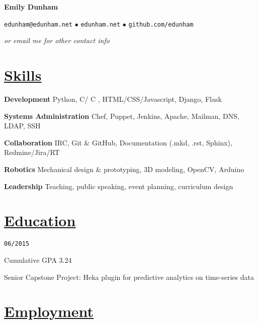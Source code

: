 \documentclass[11pt]{article}
\newcommand{\heading}[1]{
    \section*{\uline{\hfill #1}}
}
\newcommand{\squish}{
    \setlength{\itemsep}{0.5pt}
    \setlength{\parskip}{0pt}
    \setlength{\parsep}{0.5pt}
}
\newcommand{\when}[1]{
    \hfill \texttt{#1}
}
\newcommand{\experience}[3]{
\item[{#1}, \emph{#2}]
    \when{#3}
}
\newcommand{\contact}[3]{
    \centerline{
        \large       
        \texttt{#1}
        $\bullet$
        \texttt{#2}
        $\bullet$
        \texttt{#3}
    }
    \centerline{
        \emph{or email me for other contact info}
    }
}
\newcommand{\skill}[2]{
    \textbf{#1} \hfill #2

}
\newcommand{\CPP}{
    C\hspace{-.05em}\raisebox{.4ex}{\tiny\bf +}\hspace{-.10em}\raisebox{.4ex}{\tiny\bf +}
}
\begin{document}
\centerline{{\Huge \bf Emily Dunham}}
\bigskip

\contact{edunham@edunham.net}
        {edunham.net}
        {github.com/edunham}

\heading{Skills}%

\skill{Development}{Python, C/\CPP, HTML/CSS/Javascript, Django, Flask}

\skill{Systems Administration}{Chef, Puppet, Jenkins, Apache, Mailman, DNS, LDAP,
SSH}

\skill{Collaboration}{IRC, Git \& GitHub, Documentation (.mkd, .rst, Sphinx),
Redmine/Jira/RT} 

\skill{Robotics}{Mechanical design \& prototyping, 3D modeling, OpenCV, Arduino}

\skill{Leadership}{Teaching, public speaking, event planning, curriculum
design}

\heading{Education}%

\begin{description}
\squish
\experience{Oregon State University}
           {Bachelor of Science, Computer Science}
           {06/2015}

    Cumulative GPA 3.24

    Senior Capstone Project: Heka plugin for predictive analytics on
    time-series data

\end{description}

\heading{Employment}%
\end{document}
